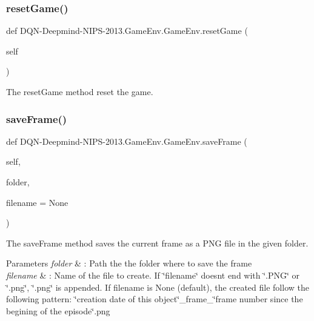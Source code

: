 \subsubsection{\texorpdfstring{reset\+Game()}{resetGame()}}
{\footnotesize\ttfamily def D\+QN-\/Deepmind-\/N\+I\+PS-\/2013.Game\+Env.\+Game\+Env.\+reset\+Game (\begin{DoxyParamCaption}\item[{}]{self }\end{DoxyParamCaption})}



The reset\+Game method reset the game. 

\hypertarget{classDQN-Deepmind-NIPS-2013_1_1GameEnv_1_1GameEnv_aed0bd85608c8373dd1ccfb27b9ae79bf}{}\label{classDQN-Deepmind-NIPS-2013_1_1GameEnv_1_1GameEnv_aed0bd85608c8373dd1ccfb27b9ae79bf} 
\subsubsection{\texorpdfstring{save\+Frame()}{saveFrame()}}
{\footnotesize\ttfamily def D\+QN-\/Deepmind-\/N\+I\+PS-\/2013.Game\+Env.\+Game\+Env.\+save\+Frame (\begin{DoxyParamCaption}\item[{}]{self,  }\item[{}]{folder,  }\item[{}]{filename = {\ttfamily None} }\end{DoxyParamCaption})}



The save\+Frame method saves the current frame as a P\+NG file in the given folder. 


\begin{DoxyParams}{Parameters}
{\em folder} & \+: Path the the folder where to save the frame \\
\hline
{\em filename} & \+: Name of the file to create. If \char`\"{}filename\char`\"{} doesn\textquotesingle{}t end with \char`\"{}.\+P\+N\+G\char`\"{} or \char`\"{}.\+png\char`\"{}, \char`\"{}.\+png\char`\"{} is appended. If filename is None (default), the created file follow the following pattern\+: \char`\"{}creation date of this 
                    object\char`\"{}\+\_\+frame\+\_\+\char`\"{}frame number since the begining of 
                    the episode\char`\"{}.png \\
\hline
\end{DoxyParams}


